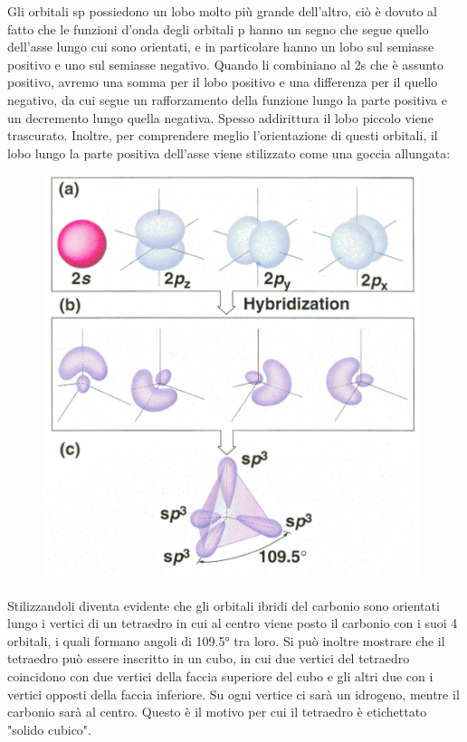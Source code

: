 Gli orbitali sp possiedono un lobo molto più grande dell'altro, ciò è dovuto al fatto che le funzioni d'onda degli orbitali p hanno un segno che segue quello dell'asse lungo cui sono orientati, e in particolare hanno un lobo sul semiasse positivo e uno sul semiasse negativo. Quando li combiniano al 2s che è assunto positivo, avremo una somma per il lobo positivo e una differenza per il quello negativo, da cui segue un rafforzamento della funzione lungo la parte positiva e un decremento lungo quella negativa. Spesso addirittura il lobo piccolo viene trascurato. Inoltre, per comprendere meglio l'orientazione di questi orbitali, il lobo lungo la parte positiva dell'asse viene stilizzato come una goccia allungata:

\begin{figure}[htp]
    \centering
    \includegraphics[width=11cm]{immagini/orbitali-sp3.png}
\end{figure}
Stilizzandoli diventa evidente che gli orbitali ibridi del carbonio sono orientati lungo i vertici di un tetraedro in cui al centro viene posto il carbonio con i suoi 4 orbitali, i quali formano angoli di 109.5° tra loro. Si può inoltre mostrare che il tetraedro può essere inscritto in un cubo, in cui due vertici del tetraedro coincidono con due vertici della faccia superiore del cubo e gli altri due con i vertici opposti della faccia inferiore. Su ogni vertice ci sarà un idrogeno, mentre il carbonio sarà al centro. Questo è il motivo per cui il tetraedro è etichettato "solido cubico".

